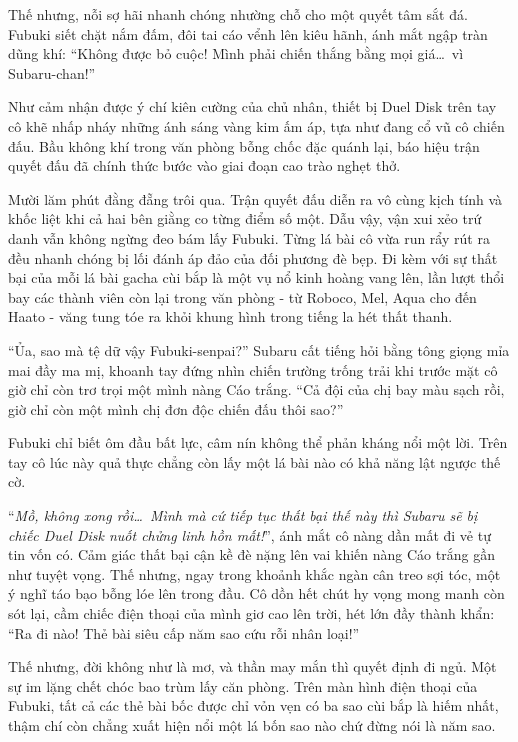 \documentclass[../main.tex]{subfiles}
\begin{document}
Thế nhưng, nỗi sợ hãi nhanh chóng nhường chỗ cho một quyết tâm sắt đá. Fubuki siết chặt nắm đấm, đôi tai cáo vểnh lên kiêu hãnh, ánh mắt ngập tràn dũng khí: ``Không được bỏ cuộc! Mình phải chiến thắng bằng mọi giá\dots\ vì Subaru-chan!''

Như cảm nhận được ý chí kiên cường của chủ nhân, thiết bị Duel Disk trên tay cô khẽ nhấp nháy những ánh sáng vàng kim ấm áp, tựa như đang cổ vũ cô chiến đấu. Bầu không khí trong văn phòng bỗng chốc đặc quánh lại, báo hiệu trận quyết đấu đã chính thức bước vào giai đoạn cao trào nghẹt thở.

\ct

Mười lăm phút đằng đẵng trôi qua. Trận quyết đấu diễn ra vô cùng kịch tính và khốc liệt khi cả hai bên giằng co từng điểm số một. Dẫu vậy, vận xui xẻo trứ danh vẫn không ngừng đeo bám lấy Fubuki. Từng lá bài cô vừa run rẩy rút ra đều nhanh chóng bị lối đánh áp đảo của đối phương đè bẹp. Đi kèm với sự thất bại của mỗi lá bài gacha cùi bắp là một vụ nổ kinh hoàng vang lên, lần lượt thổi bay các thành viên còn lại trong văn phòng - từ Roboco, Mel, Aqua cho đến Haato - văng tung tóe ra khỏi khung hình trong tiếng la hét thất thanh.

``Ủa, sao mà tệ dữ vậy Fubuki-senpai?'' Subaru cất tiếng hỏi bằng tông giọng mỉa mai đầy ma mị, khoanh tay đứng nhìn chiến trường trống trải khi trước mặt cô giờ chỉ còn trơ trọi một mình nàng Cáo trắng. ``Cả đội của chị bay màu sạch rồi, giờ chỉ còn một mình chị đơn độc chiến đấu thôi sao?''

Fubuki chỉ biết ôm đầu bất lực, câm nín không thể phản kháng nổi một lời. Trên tay cô lúc này quả thực chẳng còn lấy một lá bài nào có khả năng lật ngược thế cờ.

``\textit{Mồ, không xong rồi\dots\ Mình mà cứ tiếp tục thất bại thế này thì Subaru sẽ bị chiếc Duel Disk nuốt chửng linh hồn mất!}'', ánh mắt cô nàng dần mất đi vẻ tự tin vốn có. Cảm giác thất bại cận kề đè nặng lên vai khiến nàng Cáo trắng gần như tuyệt vọng. Thế nhưng, ngay trong khoảnh khắc ngàn cân treo sợi tóc, một ý nghĩ táo bạo bỗng lóe lên trong đầu. Cô dồn hết chút hy vọng mong manh còn sót lại, cầm chiếc điện thoại của mình giơ cao lên trời, hét lớn đầy thành khẩn: ``Ra đi nào! Thẻ bài siêu cấp năm sao cứu rỗi nhân loại!''

Thế nhưng, đời không như là mơ, và thần may mắn thì quyết định đi ngủ. Một sự im lặng chết chóc bao trùm lấy căn phòng. Trên màn hình điện thoại của Fubuki, tất cả các thẻ bài bốc được chỉ vỏn vẹn có ba sao cùi bắp là hiếm nhất, thậm chí còn chẳng xuất hiện nổi một lá bốn sao nào chứ đừng nói là năm sao.
\end{document}
